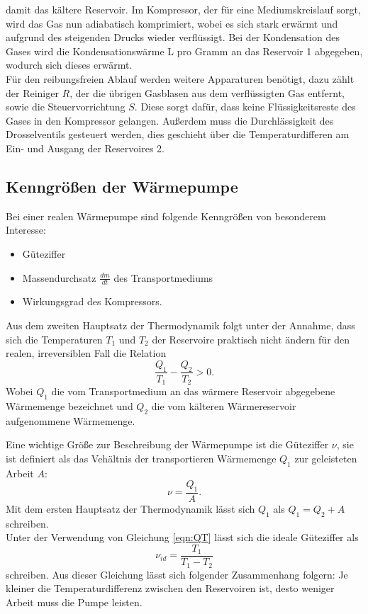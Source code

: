 damit das kältere Reservoir. Im Kompressor, der für eine Mediumskreislauf sorgt, wird das Gas nun
adiabatisch komprimiert, wobei es sich stark erwärmt und aufgrund des steigenden Drucks wieder verflüssigt.
Bei der Kondensation des Gases wird die Kondensationswärme L pro Gramm an das Reservoir 1 abgegeben, wodurch sich
dieses erwärmt.\\
Für den reibungsfreien Ablauf werden weitere Apparaturen benötigt, dazu zählt der Reiniger $R$, der
die übrigen Gasblasen aus dem verflüssigten Gas entfernt, sowie die Steuervorrichtung $S$.
Diese sorgt dafür, dass keine Flüssigkeitsreste des Gases in den Kompressor gelangen.
Außerdem muss die Durchlässigkeit des Drosselventils gesteuert werden, dies geschieht über
die Temperaturdifferen am Ein- und Ausgang der Reservoires 2.

\subsection{Kenngrößen der Wärmepumpe}
Bei einer realen Wärmepumpe sind folgende Kenngrößen von besonderem Interesse:
\begin{itemize}
  \item Güteziffer
  \item Massendurchsatz $\frac{dm}{dt}$ des Transportmediums
  \item Wirkungsgrad des Kompressors.
\end{itemize}

Aus dem zweiten Hauptsatz der Thermodynamik folgt unter der Annahme, dass sich die Temperaturen
$T_{1}$ und $T_{2}$ der Reservoire praktisch nicht ändern für den realen, irreversiblen Fall die Relation
\begin{equation}
  \frac{Q_{1}}{T_{1}}-\frac{Q_{2}}{T_{2}}>0.
  \label{eqn:QT}
\end{equation}
Wobei $Q_{1}$ die vom Transportmedium an das wärmere Reservoir abgegebene Wärmemenge bezeichnet und
$Q_{2}$ die vom kälteren Wärmereservoir aufgenommene Wärmemenge.

Eine wichtige Größe zur Beschreibung der Wärmepumpe ist die Güteziffer $\nu$, sie ist definiert
als das Vehältnis der transportieren Wärmemenge $Q_{1}$ zur geleisteten Arbeit $A$:
\begin{equation}
  \nu=\frac{Q_{1}}{A}.
  \label{eqn:güte}
\end{equation}
Mit dem ersten Hauptsatz der Thermodynamik lässt sich $Q_{1}$ als $Q_{1}=Q_{2}+A$ schreiben.\\
Unter der Verwendung von Gleichung \ref{eqn:QT} lässt sich die ideale Güteziffer als
\begin{equation}
  \nu_{id}=\frac{T_{1}}{T_{1}-T_{2}}
  \label{eqn:güte2}
\end{equation}
schreiben. Aus dieser Gleichung lässt sich folgender Zusammenhang folgern:
Je kleiner die Temperaturdifferenz zwischen den Reservoiren ist, desto weniger Arbeit muss
die Pumpe leisten.

